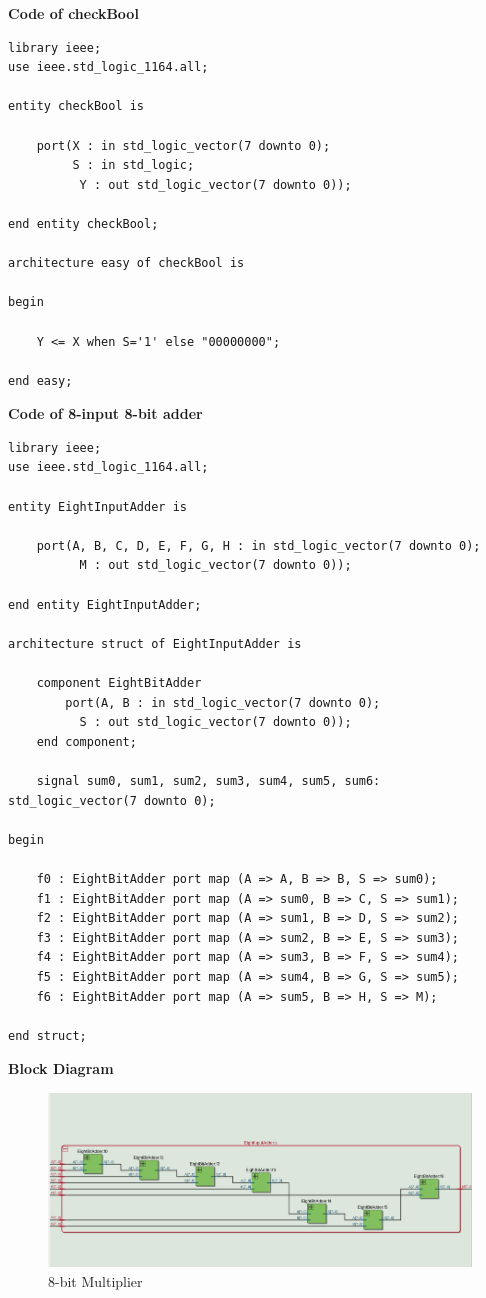 \documentclass[12pt]{article}
\begin{document}
        \noindent
        \textbf{Code of checkBool}
        \noindent
        \begin{verbatim}
library ieee;
use ieee.std_logic_1164.all;

entity checkBool is

	port(X : in std_logic_vector(7 downto 0);
		 S : in std_logic;
		  Y : out std_logic_vector(7 downto 0));
		  
end entity checkBool;

architecture easy of checkBool is

begin

	Y <= X when S='1' else "00000000";

end easy;
        \end{verbatim}

        \noindent
        \textbf{Code of 8-input 8-bit adder}
        \noindent
        \begin{verbatim}
library ieee;
use ieee.std_logic_1164.all;

entity EightInputAdder is

	port(A, B, C, D, E, F, G, H : in std_logic_vector(7 downto 0);
		  M : out std_logic_vector(7 downto 0));
		  
end entity EightInputAdder;

architecture struct of EightInputAdder is

	component EightBitAdder
		port(A, B : in std_logic_vector(7 downto 0);
		  S : out std_logic_vector(7 downto 0));
	end component;
	
	signal sum0, sum1, sum2, sum3, sum4, sum5, sum6: std_logic_vector(7 downto 0);
	
begin

	f0 : EightBitAdder port map (A => A, B => B, S => sum0);
	f1 : EightBitAdder port map (A => sum0, B => C, S => sum1);
	f2 : EightBitAdder port map (A => sum1, B => D, S => sum2);
	f3 : EightBitAdder port map (A => sum2, B => E, S => sum3);
	f4 : EightBitAdder port map (A => sum3, B => F, S => sum4);
	f5 : EightBitAdder port map (A => sum4, B => G, S => sum5);
	f6 : EightBitAdder port map (A => sum5, B => H, S => M);
	
end struct;      
        \end{verbatim}
        \noindent
        \textbf{Block Diagram}
        \begin{figure}[H]
            \centering
            \includegraphics[width=0.8\linewidth]{eightInputAdder.png}
            \caption{8-bit Multiplier}
            \label{fig:instru}
        \end{figure} 
\end{document}
